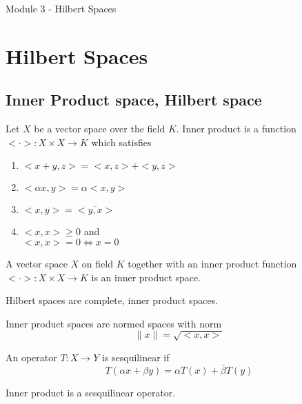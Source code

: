 \pagebreak
{\Large Module 3 - Hilbert Spaces}
\section{Hilbert Spaces}
\subsection{Inner Product space, Hilbert space}
\begin{definition}
	Let $X$ be a vector space over the field $K$.
	Inner product is a function $<\cdot> : X \times X \to K$ which satisfies
	\begin{enumerate}
		\item $<x+y,z> = <x,z> + <y,z>$
		\item $<\alpha x,y> = \alpha <x,y>$
		\item $<x,y> = \overline{<y,x>}$
		\item $<x,x> \ge 0$ and \\
			$<x,x> = 0 \iff x = 0$
	\end{enumerate}
\end{definition}
\begin{definition}
	A vector space $X$ on field $K$ together with an inner product function $<\cdot> : X \times X \to K$ is an inner product space.
\end{definition}
\begin{definition}[Hilbert]
	Hilbert spaces are complete, inner product spaces.
\end{definition}

\begin{remark}
	Inner product spaces are normed spaces with norm 
	\[ \|x\| = \sqrt{<x,x>} \]
\end{remark}

\begin{definition}[sesquilinear]
	An operator $T : X \to Y$ is sesquilinear if 
	\[ T(\alpha x + \beta y) = \alpha T(x) + \bar{\beta}T(y) \]
\end{definition}

\begin{important}
Inner product is a sesquilinear operator.
\end{important}

